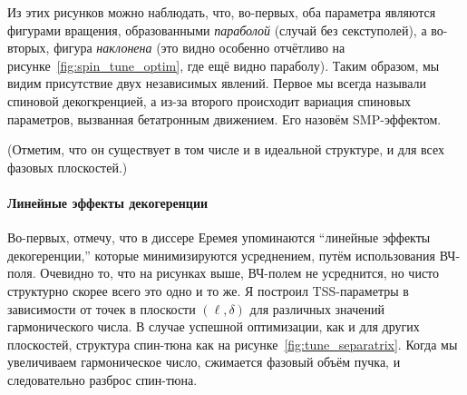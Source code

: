 \documentclass{article}     %
\begin{document}
Из этих рисунков можно наблюдать, что, во-первых, оба параметра являются фигурами вращения,
образованными \emph{параболой} (случай без секступолей), а во-вторых, фигура \emph{наклонена}
(это видно особенно отчётливо на рисунке~\ref{fig:spin_tune_optim}, где ещё видно параболу).
Таким образом, мы видим присутствие двух независимых явлений. Первое мы всегда называли спиновой декогкренцией,
а из-за второго происходит вариация спиновых параметров, вызванная бетатронным движением.
Его назовём SMP-эффектом.

(Отметим, что он существует в том числе и в идеальной структуре, и для всех фазовых плоскостей.)

\paragraph{Линейные эффекты декогеренции}
Во-первых, отмечу, что в диссере Еремея упоминаются ``линейные эффекты декогеренции,'' которые
минимизируются усреднением, путём использования ВЧ-поля. Очевидно то, что на рисунках выше, ВЧ-полем
не усреднится, но чисто структурно скорее всего это одно и то же. Я построил TSS-параметры
в зависимости от точек в плоскости $(\ell, \delta)$ для различных значений гармонического числа.
В случае успешной оптимизации, как и для других плоскостей, структура спин-тюна как на
рисунке~\ref{fig:tune_separatrix}. Когда мы увеличиваем гармоническое число, сжимается фазовый объём
пучка, и следовательно разброс спин-тюна. 
\end{document}
